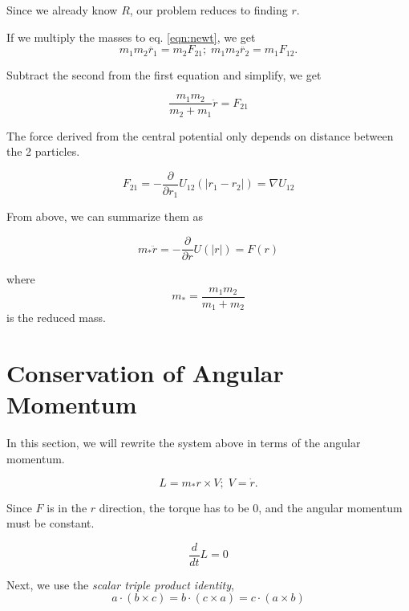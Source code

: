 \documentclass{article}
\begin{document}
Since we already know $R$, our problem reduces to finding $r$.

If we multiply the masses to eq. \ref{eqn:newt}, we get 
\begin{equation}
    m_1 m_2 \ddot{r_1} = m_2F_{21}; \; m_1m_2 \ddot{r_2} = m_1F_{12}.
\end{equation}

Subtract the second from the first equation and simplify, we get

\begin{equation}
    \frac{m_1m_2}{m_2 + m_1} \ddot{r} = F_{21}
\end{equation}

The force derived from the central potential only depends on distance between the 2 particles.

\begin{equation}
    F_{21} = - \frac{\partial}{\partial r_1} U_{12} (|r_1 - r_2|) =  \nabla U_{12}
\end{equation}

From above, we can summarize them as 

\begin{equation}
    m_\ast \ddot{r} = - \frac{\partial}{\partial r} U(|r|) = F(r)
\end{equation}

where 
\begin{equation}
    m_\ast = \frac{m_1m_2}{m_1 + m_2}
\end{equation}
 is the reduced mass.

\section{Conservation of Angular Momentum}

In this section, we will rewrite the system above in terms of the angular momentum.

\begin{equation}
    L = m_\ast r \times V ;\; V = \dot{r}.
\end{equation}

Since $F$ is in the $r$ direction, the torque has to be $0$, and the angular momentum must be constant.

\begin{equation}
    \frac{d}{dt} L = 0
\end{equation}

Next, we use the \emph{scalar triple product identity},
\begin{equation}
    a \cdot (b\times c) = b \cdot (c\times a) = c \cdot (a\times b)
\end{equation}
\end{document}
